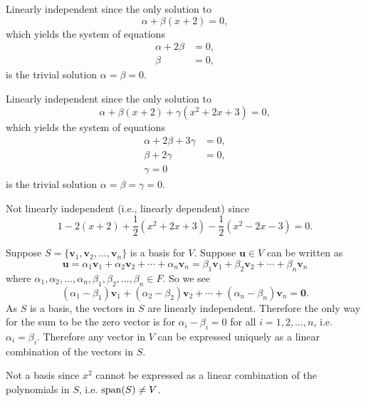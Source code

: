 \begin{questions}
    \item \begin{partquestions}{\alph*}
        \item Linearly independent since the only solution to
        \[
            \alpha + \beta(x+2) = 0,
        \]
        which yields the system of equations
        \begin{align*}
            \alpha + 2\beta &= 0,\\
            \beta &= 0,
        \end{align*}
        is the trivial solution $\alpha = \beta = 0$.

        \item Linearly independent since the only solution to
        \[
            \alpha + \beta(x+2) + \gamma(x^2 + 2x + 3) = 0,
        \]
        which yields the system of equations
        \begin{align*}
            \alpha + 2\beta + 3\gamma &= 0,\\
            \beta + 2\gamma &= 0,\\
            \gamma = 0
        \end{align*}
        is the trivial solution $\alpha = \beta = \gamma = 0$.

        \item Not linearly independent (i.e., linearly dependent) since
        \[
            1 - 2(x+2) + \frac12(x^2 + 2x + 3) - \frac12(x^2 - 2x - 3) = 0.
        \]
    \end{partquestions}

    \item Suppose $S = \{\mathbf{v}_1, \mathbf{v}_2, \dots, \mathbf{v}_n\}$ is a basis for $V$. Suppose $\mathbf{u} \in V$ can be written as
    \[
        \mathbf{u} = \alpha_1\mathbf{v}_1 + \alpha_2\mathbf{v}_2 + \cdots + \alpha_n\mathbf{v}_n = \beta_1\mathbf{v}_1 + \beta_2\mathbf{v}_2 + \cdots + \beta_n\mathbf{v}_n
    \]
    where $\alpha_1, \alpha_2, \dots, \alpha_n, \beta_1, \beta_2, \dots, \beta_n \in F$. So we see
    \[
        (\alpha_1 - \beta_1)\mathbf{v}_1 + (\alpha_2 - \beta_2)\mathbf{v}_2 + \cdots + (\alpha_n - \beta_n)\mathbf{v}_n = \mathbf{0}.
    \]
    As $S$ is a basis, the vectors in $S$ are linearly independent. Therefore the only way for the sum to be the zero vector is for $\alpha_i - \beta_i = 0$ for all $i = 1, 2, \dots, n$, i.e. $\alpha_i = \beta_i$. Therefore any vector in $V$ can be expressed uniquely as a linear combination of the vectors in $S$.

    \item \begin{partquestions}{\alph*}
        \item Not a basis since $x^2$ cannot be expressed as a linear combination of the polynomials in $S$, i.e. $\mathrm{span}(S) \neq V$.


\end{partquestions}
\end{questions}
